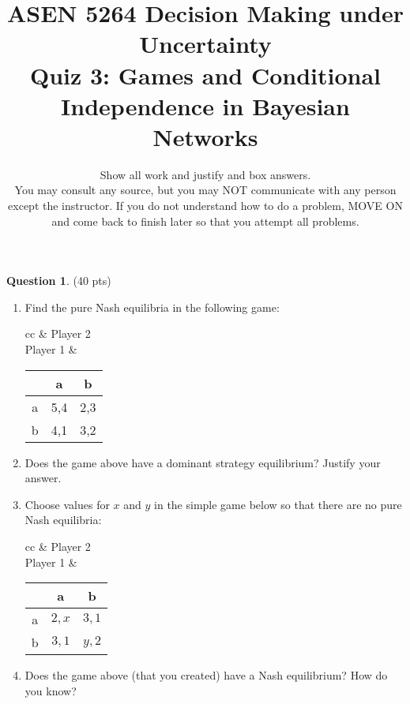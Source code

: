 \documentclass{article}
\title{ASEN 5264 Decision Making under Uncertainty\\
       Quiz 3: Games and Conditional Independence in Bayesian Networks}
\date{\small Show all work and justify and box answers.\\
You may consult any source, but you may NOT communicate with any person except the instructor. If you do not understand how to do a problem, MOVE ON and come back to finish later so that you attempt all problems.
}
\theoremstyle{definition}
\newtheorem{question}[thm]{Question}
\begin{document}
\maketitle

\begin{question} (40 pts)
    \begin{enumerate}[label=\alph*)]
        \item Find the pure Nash equilibria in the following game:
            \begin{center}
                \begin{tabular}{cc}
                & Player 2\\
                    Player 1 & 
            \begin{tabular}{c|c|c|}
            & a & b \\ \hline
            a & 5,4 & 2,3 \\ \hline
            b & 4,1 & 3,2 \\ \hline
            \end{tabular}
                \end{tabular}
            \end{center}
        \item Does the game above have a dominant strategy equilibrium? Justify your answer.
        \item Choose values for $x$ and $y$ in the simple game below so that there are no pure Nash equilibria:
            \begin{center}
                \begin{tabular}{cc}
                & Player 2\\
                    Player 1 & 
            \begin{tabular}{c|c|c|}
            & a & b \\ \hline
            a & $2, x$ & $3, 1$ \\ \hline
            b & $3, 1$ & $y, 2$\\ \hline
            \end{tabular}
                \end{tabular}
            \end{center}
        \item Does the game above (that you created) have a Nash equilibrium? How do you know?
    \end{enumerate}
\end{question}
\end{document}
